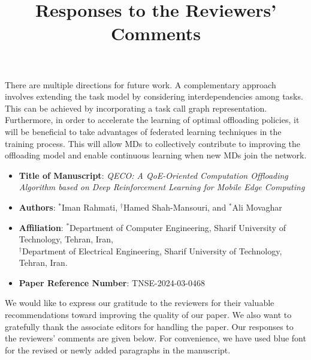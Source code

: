 \documentclass[12pt,draftclsnofoot,onecolumn]{IEEEtran}
\begin{document}
There are multiple directions for future work. A complementary approach involves extending the task model by considering interdependencies among tasks. This can be achieved by incorporating a task call graph representation. Furthermore, in order to accelerate the learning of optimal offloading policies, it will be beneficial to take advantages of federated learning techniques in the training process. This will allow MDs to collectively contribute to improving the offloading model and enable continuous learning when new MDs join the network.





\newpage





\title{Responses to the Reviewers' Comments}

\maketitle

\vspace{-1.5cm}

\setcounter{page}{1}

\begin{itemize}
	\item \textbf{Title of Manuscript}: \textit{QECO: A QoE-Oriented Computation Offloading Algorithm based on Deep Reinforcement Learning for Mobile Edge Computing}


	
	
	\item \textbf{Authors}:  $^\ast$Iman Rahmati, $^\dagger$Hamed Shah-Mansouri, and $^\ast$Ali Movaghar
	
	
	\item \textbf{Affiliation}: $^\ast$Department of Computer Engineering,  Sharif University of Technology, Tehran, Iran, \\ $^\dagger$Department of Electrical Engineering, Sharif University of Technology, Tehran, Iran.
	
	\item \textbf{Paper Reference Number}: TNSE-2024-03-0468 
	
\end{itemize}

\vspace{0.3cm}


\noindent We would like to express our gratitude to the reviewers for their valuable recommendations toward improving the quality of our paper. We also want to gratefully thank the associate editors for handling the paper. Our responses to the reviewers' comments are given below. For convenience, we have used blue font for the revised or newly added paragraphs in the manuscript.\newline
\end{document}
